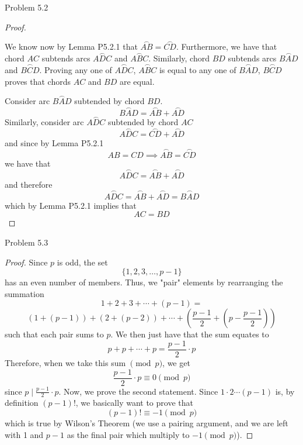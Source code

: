 \begin{sol}{Problem 5.2}
\begin{proof}
\begin{center}
\end{center}
We know now by Lemma P5.2.1 that $\overset{\frown}{AB} = \overset{\frown}{CD}$. Furthermore, we have that chord $AC$ subtends arcs $\overset{\frown}{ADC}$ and $\overset{\frown}{ABC}$. Similarly, chord $BD$ subtends arcs $\overset{\frown}{BAD}$ and $\overset{\frown}{BCD}$. Proving any one of $\overset{\frown}{ADC}$, $\overset{\frown}{ABC}$ is equal to any one of $\overset{\frown}{BAD}$, $\overset{\frown}{BCD}$ proves that chords $AC$ and $BD$ are equal.

Consider arc $\overset{\frown}{BAD}$ subtended by chord $BD$. 
\[
\overset{\frown}{BAD} = \overset{\frown}{AB} + \overset{\frown}{AD}
\]
Similarly, consider arc $\overset{\frown}{ADC}$ subtended by chord $AC$
\[
\overset{\frown}{ADC} = \overset{\frown}{CD} + \overset{\frown}{AD}
\]
and since by Lemma P5.2.1
\[
AB = CD \implies \overset{\frown}{AB} = \overset{\frown}{CD}
\]
we have that 
\[
\overset{\frown}{ADC} = \overset{\frown}{AB} + \overset{\frown}{AD}
\]
and therefore
\[
\overset{\frown}{ADC} = \overset{\frown}{AB} + \overset{\frown}{AD} = \overset{\frown}{BAD}
\]
which by Lemma P5.2.1 implies that
\[
AC = BD
\]
\end{proof}
\end{sol}

\begin{sol}{Problem 5.3}
\begin{proof}
Since $p$ is odd, the set 
\[
\{1, 2, 3, \ldots, p-1\} 
\]
has an even number of members. Thus, we "pair" elements by rearranging the summation
\[
1 + 2 + 3 + \cdots + (p-1) = 
\]
\[
(1 + (p-1)) + (2 + (p-2)) + \cdots + \left(\frac{p-1}{2} + \left(p - \frac{p-1}{2}\right)\right)
\]
such that each pair sums to $p$. We then just have that the sum equates to 
\[
p + p + \cdots + p = \frac{p-1}{2} \cdot p
\]
Therefore, when we take this sum $\pmod{p}$, we get
\[
\frac{p-1}{2} \cdot p \equiv 0 \pmod{p}
\]
since $p \mid \frac{p-1}{2} \cdot p$. Now, we prove the second statement. Since $1 \cdot 2 \cdots (p-1)$ is, by definition $(p-1)!$, we basically want to prove that
\[
(p-1)! \equiv -1 \pmod{p}
\]
which is true by Wilson's Theorem (we use a pairing argument, and we are left with 1 and $p-1$ as the final pair which multiply to $-1 \pmod{p}$). 
\end{proof}
\end{sol}

